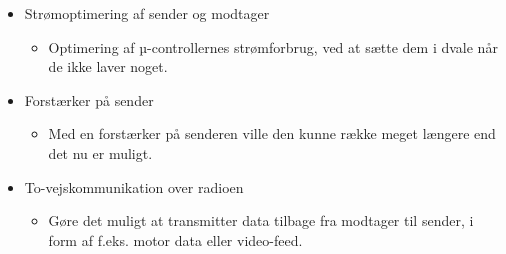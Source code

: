 \documentclass[Main]{subfiles}
\begin{document}
\begin{itemize}
\item Strømoptimering af sender og modtager
\vspace{-10pt}
	\begin{itemize}
	\item Optimering af µ-controllernes strømforbrug, ved at sætte dem i dvale når de ikke laver noget.
	\end{itemize}

\item Forstærker på sender
\vspace{-10pt}
	\begin{itemize}
	\item Med en forstærker på senderen ville den kunne række meget længere end det nu er muligt.
	\end{itemize}
	
\item To-vejskommunikation over radioen
\vspace{-10pt}
	\begin{itemize}
	\item Gøre det muligt at transmitter data tilbage fra modtager til sender, i form af f.eks. motor data eller video-feed.
	\end{itemize}	
	

\end{itemize}
\end{document}
